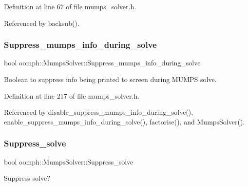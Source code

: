 Definition at line 67 of file mumps\+\_\+solver.\+h.



Referenced by backsub().

\mbox{\label{classoomph_1_1MumpsSolver_acfc51e1ed214d9d2dc5a83b04a08d1f7}} 
\subsubsection{\texorpdfstring{Suppress\+\_\+mumps\+\_\+info\+\_\+during\+\_\+solve}{Suppress\_mumps\_info\_during\_solve}}
{\footnotesize\ttfamily bool oomph\+::\+Mumps\+Solver\+::\+Suppress\+\_\+mumps\+\_\+info\+\_\+during\+\_\+solve\hspace{0.3cm}{\ttfamily [private]}}



Boolean to suppress info being printed to screen during M\+U\+M\+PS solve. 



Definition at line 217 of file mumps\+\_\+solver.\+h.



Referenced by disable\+\_\+suppress\+\_\+mumps\+\_\+info\+\_\+during\+\_\+solve(), enable\+\_\+suppress\+\_\+mumps\+\_\+info\+\_\+during\+\_\+solve(), factorise(), and Mumps\+Solver().

\mbox{\label{classoomph_1_1MumpsSolver_a851b95821f3adce5545e7abe238b3cce}} 
\subsubsection{\texorpdfstring{Suppress\+\_\+solve}{Suppress\_solve}}
{\footnotesize\ttfamily bool oomph\+::\+Mumps\+Solver\+::\+Suppress\+\_\+solve\hspace{0.3cm}{\ttfamily [private]}}



Suppress solve? 




